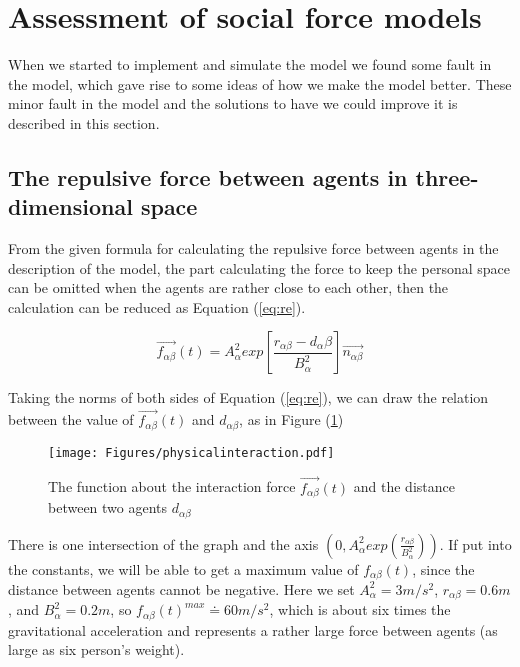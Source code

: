 \section{Assessment of social force models}
\label{sec:assessment}
When we started to implement and simulate the model we found some fault
in the model, which gave rise to some ideas of how we make the model better.
These minor fault in the model and the solutions to have we could improve it
is described in this section.

\subsection{The repulsive force between agents in three-dimensional space}
From the given formula for calculating the repulsive force between agents in the 
description of the model, the part calculating the force to keep the personal space 
can be omitted when the agents are rather close to each other, then the calculation 
can be reduced as Equation (\ref{eq:re}).

\begin{equation}\label{eq:re}
\overrightarrow{f_{\alpha\beta}}(t) = A_{\alpha}^{2} exp\left[ \frac{r_{\alpha\beta} - d_{\alpha}\beta}{B_{\alpha}^{2}}\right]  \overrightarrow{n_{\alpha\beta}}
\end{equation}

Taking the norms of both sides of Equation (\ref{eq:re}), we can draw the relation 
between the value of $\overrightarrow{f_{\alpha\beta}}(t)$ and $d_{\alpha \beta}$, 
as in Figure (\ref{fig:physicalinteraction})
\\
\begin{figure}
\centering
\texttt{[image: Figures/physicalinteraction.pdf]} 
\caption{The function about the interaction force $\vec{f_{\alpha\beta}}(t)$ and the distance between two agents
$d_{\alpha\beta}$ }\label{fig:physicalinteraction}
\end{figure}

There is one intersection of the graph and the axis $ \left( 0, A_{\alpha}^{2} exp\left( \frac{r_{\alpha\beta} }{B_{\alpha}^{2}}\right)  \right) $. 
If put into the constants, we will be able to get a maximum value of $ f_{\alpha\beta}(t) $, 
since the distance between agents cannot be negative. Here we set $ A_{\alpha}^{2} = 3 m/s^{2} $, 
$ r_{\alpha\beta} = 0.6 m $, and $ B_{\alpha}^{2} = 0.2 m $, so $ f_{\alpha\beta}(t)^{max} \doteq 60 m/s^{2} $, 
which is about six times the gravitational acceleration and represents a rather 
large force between agents (as large as six person's weight).

